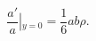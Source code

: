 \begin{equation}\label{junc1}
\frac{a'}{a}\left|_{y=0} \right. = \frac{1}{6}ab \rho.
\end{equation}

